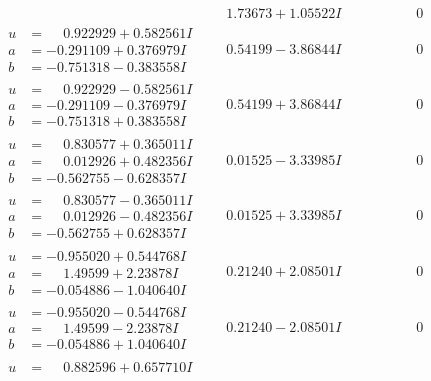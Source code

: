 \documentclass[1p]{elsarticle_modified}
\theoremstyle{definition}
\begin{document}
$$\begin{array}{c|c|c}
 & \phantom{-}1.73673 + 1.05522 I & \phantom{-0.000000 } 0 \\ \hline\begin{aligned}
u &= \phantom{-}0.922929 + 0.582561 I \\
a &= -0.291109 + 0.376979 I \\
b &= -0.751318 - 0.383558 I\end{aligned}
 & \phantom{-}0.54199 - 3.86844 I & \phantom{-0.000000 } 0 \\ \hline\begin{aligned}
u &= \phantom{-}0.922929 - 0.582561 I \\
a &= -0.291109 - 0.376979 I \\
b &= -0.751318 + 0.383558 I\end{aligned}
 & \phantom{-}0.54199 + 3.86844 I & \phantom{-0.000000 } 0 \\ \hline\begin{aligned}
u &= \phantom{-}0.830577 + 0.365011 I \\
a &= \phantom{-}0.012926 + 0.482356 I \\
b &= -0.562755 - 0.628357 I\end{aligned}
 & \phantom{-}0.01525 - 3.33985 I & \phantom{-0.000000 } 0 \\ \hline\begin{aligned}
u &= \phantom{-}0.830577 - 0.365011 I \\
a &= \phantom{-}0.012926 - 0.482356 I \\
b &= -0.562755 + 0.628357 I\end{aligned}
 & \phantom{-}0.01525 + 3.33985 I & \phantom{-0.000000 } 0 \\ \hline\begin{aligned}
u &= -0.955020 + 0.544768 I \\
a &= \phantom{-}1.49599 + 2.23878 I \\
b &= -0.054886 - 1.040640 I\end{aligned}
 & \phantom{-}0.21240 + 2.08501 I & \phantom{-0.000000 } 0 \\ \hline\begin{aligned}
u &= -0.955020 - 0.544768 I \\
a &= \phantom{-}1.49599 - 2.23878 I \\
b &= -0.054886 + 1.040640 I\end{aligned}
 & \phantom{-}0.21240 - 2.08501 I & \phantom{-0.000000 } 0 \\ \hline\begin{aligned}
u &= \phantom{-}0.882596 + 0.657710 I \\

\end{aligned}
\end{array}$$
\end{document}
